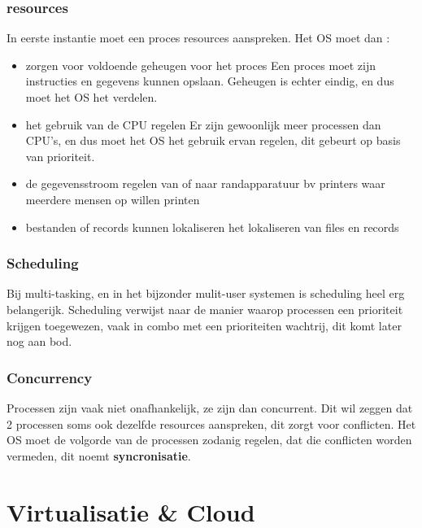 \documentclass{report}
\begin{document}
   			\subsection{resources}
   				In eerste instantie moet een proces resources aanspreken. Het OS moet dan : 
   				\begin{itemize}
   					\item zorgen voor voldoende geheugen voor het proces
   						\subitem Een proces moet zijn instructies en gegevens kunnen opslaan. Geheugen is echter eindig, en dus moet het OS het verdelen. 
   					\item het gebruik van de CPU regelen 
   						\subitem Er zijn gewoonlijk meer processen dan CPU's, en dus moet het OS het gebruik ervan regelen, dit gebeurt op basis van prioriteit.
   					\item de gegevensstroom regelen van of naar randapparatuur
   						\subitem bv printers waar meerdere mensen op willen printen
   					\item bestanden of records kunnen lokaliseren
   						\subitem het lokaliseren van files en records 
   				\end{itemize}
   			\subsection{Scheduling}
   				Bij multi-tasking, en in het bijzonder mulit-user systemen is scheduling heel erg belangerijk. Scheduling verwijst naar de manier waarop processen een prioriteit krijgen toegewezen, vaak in combo met een prioriteiten wachtrij, dit komt later nog aan bod.
   			\subsection{Concurrency}
   				Processen zijn vaak niet onafhankelijk, ze zijn dan concurrent. Dit wil zeggen dat 2 processen soms ook dezelfde resources aanspreken, dit zorgt voor conflicten. Het OS moet de volgorde van de processen zodanig regelen, dat die conflicten worden vermeden, dit noemt \textbf{syncronisatie}.
   	\chapter{Virtualisatie \& Cloud}
\end{document}
